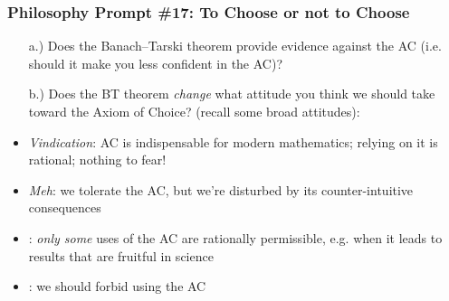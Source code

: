 \begin{frame}
\frametitle{Philosophy Prompt \#17: To Choose or not to Choose}

\begin{itemize}[<+->]


\item[a.)] Does the Banach--Tarski theorem provide evidence against the AC (i.e. should it make you less confident in the AC)?

\item[b.)] Does the BT theorem \textit{change} what attitude you think we should take toward the Axiom of Choice? (recall some broad attitudes):

\medskip 

\bi

\item \emph{Vindication}: AC is indispensable for modern mathematics; relying on it is rational; nothing to fear! 

\item \emph{Meh}: we tolerate the AC, but we're disturbed by its counter-intuitive consequences

\item {}: \textit{only some} uses of the AC are rationally permissible, e.g. when it leads to results that are fruitful in science 

\item {}: we should forbid using the AC

\ei





\end{itemize}
\end{frame}
